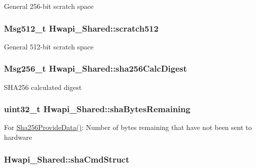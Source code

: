 General 256-\/bit scratch space \hypertarget{structHwapi__Shared_a707b025b939b5943f26ee242f75e427f}{
\subsubsection[{scratch512}]{\setlength{\rightskip}{0pt plus 5cm}Msg512\-\_\-t Hwapi\-\_\-\-Shared\-::scratch512}}\label{structHwapi__Shared_a707b025b939b5943f26ee242f75e427f}
General 512-\/bit scratch space \hypertarget{structHwapi__Shared_aac6ac13e7b4085e0d320c955f7fbff1b}{
\subsubsection[{sha256\-Calc\-Digest}]{\setlength{\rightskip}{0pt plus 5cm}Msg256\-\_\-t Hwapi\-\_\-\-Shared\-::sha256\-Calc\-Digest}}\label{structHwapi__Shared_aac6ac13e7b4085e0d320c955f7fbff1b}
S\-H\-A256 calculated digest \hypertarget{structHwapi__Shared_aaf862461fed63c6397f015cf4efc1550}{
\subsubsection[{sha\-Bytes\-Remaining}]{\setlength{\rightskip}{0pt plus 5cm}uint32\-\_\-t Hwapi\-\_\-\-Shared\-::sha\-Bytes\-Remaining}}\label{structHwapi__Shared_aaf862461fed63c6397f015cf4efc1550}
For \hyperlink{sha_8h_aaa10e604bde7ad91ac25281af784e1fc}{Sha256\-Provide\-Data()}\-: Number of bytes remaining that have not been sent to hardware \hypertarget{structHwapi__Shared_ae1de50602efac5a048bc583dd0d421a5}{
\subsubsection[{sha\-Cmd\-Struct}]{ Hwapi\-\_\-\-Shared\-::sha\-Cmd\-Struct}}\label{structHwapi__Shared_ae1de50602efac5a048bc583dd0d421a5}
